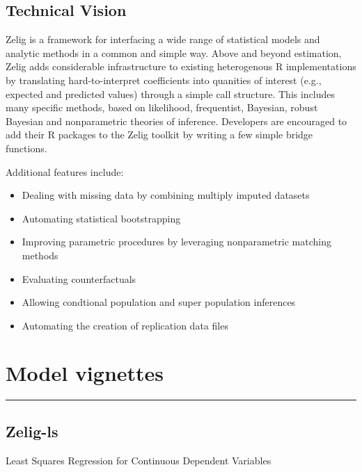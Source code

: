 \documentclass[letterpaper,10pt,english]{sphinxmanual}
\begin{document}
\section{Technical Vision}
\label{about:technical-vision}
Zelig is a framework for interfacing a wide range of statistical models and analytic methods in a common and simple way. Above and beyond estimation, Zelig adds considerable infrastructure to existing heterogenous R implementations by translating hard-to-interpret coefficients into quanities of interest (e.g., expected and predicted values) through a simple call structure. This includes many specific methods, based on likelihood, frequentist, Bayesian, robust Bayesian and nonparametric theories of inference. Developers are encouraged to add their R packages to the Zelig toolkit by writing a few simple bridge functions.

Additional features include:
\begin{itemize}
\item {} 
Dealing with missing data by combining multiply imputed datasets

\item {} 
Automating statistical bootstrapping

\item {} 
Improving parametric procedures by leveraging nonparametric matching methods

\item {} 
Evaluating counterfactuals

\item {} 
Allowing condtional population and super population inferences

\item {} 
Automating the creation of replication data files

\end{itemize}


\chapter{Model vignettes}
\label{vignette:vignettes}\label{vignette::doc}\label{vignette:model-vignettes}

\bigskip\hrule{}\bigskip



\section{Zelig-ls}
\label{vignette:zelig-ls}
Least Squares Regression for Continuous Dependent Variables
\end{document}
